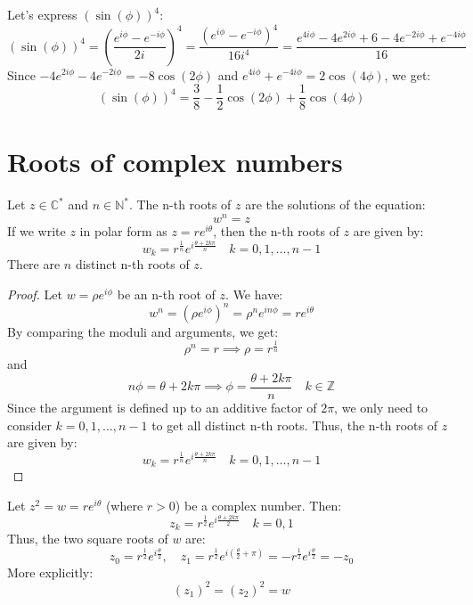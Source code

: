 \begin{eg}
    Let's express $(\sin(\phi))^4$:
    \[
        (\sin(\phi))^4 = \left( \frac{e^{i\phi} - e^{-i\phi}}{2i} \right)^4 = \frac{(e^{i\phi} - e^{-i\phi})^4}{16 i^4} = \frac{e^{4i\phi} - 4e^{2i\phi} + 6 - 4e^{-2i\phi} + e^{-4i\phi}}{16}
    \]
    Since $-4e^{2i\phi} - 4e^{-2i\phi} = -8 \cos(2\phi)$ and $e^{4i\phi} + e^{-4i\phi} = 2 \cos(4\phi)$, we get:
    \[
        (\sin(\phi))^4 = \frac{3}{8} - \frac{1}{2} \cos(2\phi) + \frac{1}{8} \cos(4\phi)
    \]
\end{eg}

\section{Roots of complex numbers}
\begin{definition}
    Let $z \in \mathbb{C}^*$ and $n \in \mathbb{N}^*$. The n-th roots of $z$ are the solutions of the equation:
    \[    w^n = z
    \]
    If we write $z$ in polar form as $z = r e^{i \theta}$, then the n-th roots of $z$ are given by:
    \[
        w_k = r^{\frac{1}{n}} e^{i \frac{\theta + 2k\pi}{n}} \quad k = 0, 1, \ldots, n-1
    \]
    There are $n$ distinct n-th roots of $z$.
\end{definition}
\begin{proof}
    Let $w = \rho e^{i \phi}$ be an n-th root of $z$. We have:
    \[
        w^n = (\rho e^{i \phi})^n = \rho^n e^{i n \phi} = r e^{i \theta}
    \]
    By comparing the moduli and arguments, we get:
    \[
        \rho^n = r \implies \rho = r^{\frac{1}{n}}
    \]
    and
    \[
        n \phi = \theta + 2k\pi \implies \phi = \frac{\theta + 2k\pi}{n} \quad k \in \mathbb{Z}
    \]
    Since the argument is defined up to an additive factor of $2\pi$, we only need to consider $k = 0, 1, \ldots, n-1$ to get all distinct n-th roots. Thus, the n-th roots of $z$ are given by:
    \[
        w_k = r^{\frac{1}{n}} e^{i \frac{\theta + 2k\pi}{n}} \quad k = 0, 1, \ldots, n-1
    \]
\end{proof}

\begin{eg}
    Let $z^2 = w = re^{i \theta}$ (where $r > 0$) be a complex number. Then:
    \[
        z_k = r^{\frac{1}{2}} e^{i \frac{\theta + 2k\pi}{2}} \quad k = 0, 1
    \]
    Thus, the two square roots of $w$ are:
    \[        z_0 = r^{\frac{1}{2}} e^{i \frac{\theta}{2}}, \quad z_1 = r^{\frac{1}{2}} e^{i \left(\frac{\theta}{2} + \pi\right)} = -r^{\frac{1}{2}} e^{i \frac{\theta}{2}} = -z_0
    \]
    More explicitly:
    \[
        (z_1)^2 = (z_2)^2 = w
    \]
\end{eg}

